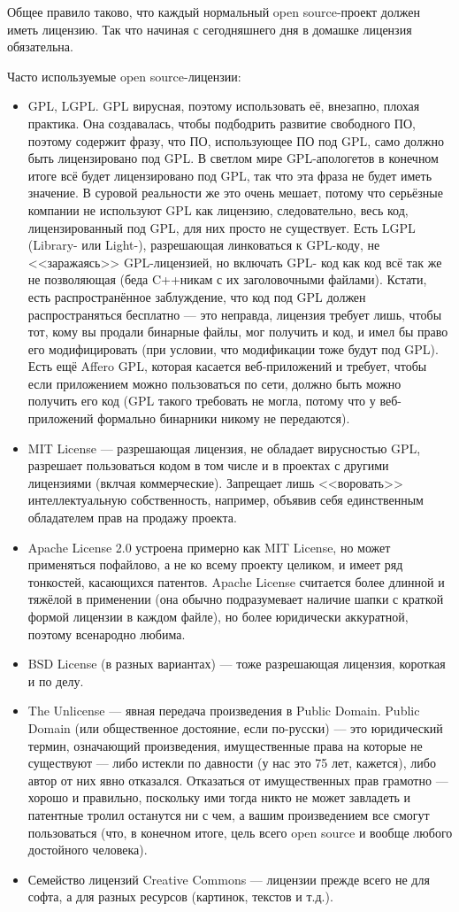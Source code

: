 \documentclass{../../text-style}
\begin{document}
Общее правило таково, что каждый нормальный open source-проект должен иметь лицензию. Так что начиная с сегодняшнего дня в домашке лицензия обязательна.

Часто используемые open source-лицензии:

\begin{itemize}
    \item GPL, LGPL. GPL вирусная, поэтому использовать её, внезапно, плохая практика. Она создавалась, чтобы подбодрить развитие свободного ПО, поэтому содержит фразу, что ПО, использующее ПО под GPL, само должно быть лицензировано под GPL. В светлом мире GPL-апологетов в конечном итоге всё будет лицензировано под GPL, так что эта фраза не будет иметь значение. В суровой реальности же это очень мешает, потому что серьёзные компании не используют GPL как лицензию, следовательно, весь код, лицензированный под GPL, для них просто не существует. Есть LGPL (Library- или Light-), разрешающая линковаться к GPL-коду, не <<заражаясь>> GPL-лицензией, но включать GPL- код как код всё так же не позволяющая (беда C++никам с их заголовочными файлами). Кстати, есть распространённое заблуждение, что код под GPL должен распространяться бесплатно --- это неправда, лицензия требует лишь, чтобы тот, кому вы продали бинарные файлы, мог получить и код, и имел бы право его модифицировать (при условии, что модификации тоже будут под GPL). Есть ещё Affero GPL, которая касается веб-приложений и требует, чтобы если приложением можно пользоваться по сети, должно быть можно получить его код (GPL такого требовать не могла, потому что у веб-приложений формально бинарники никому не передаются).
    \item MIT License --- разрешающая лицензия, не обладает вирусностью GPL, разрешает пользоваться кодом в том числе и в проектах с другими лицензиями (вклчая коммерческие). Запрещает лишь <<воровать>> интеллектуальную собственность, например, объявив себя единственным обладателем прав на продажу проекта.
    \item Apache License 2.0 устроена примерно как MIT License, но может применяться пофайлово, а не ко всему проекту целиком, и имеет ряд тонкостей, касающихся патентов. Apache License считается более длинной и тяжёлой в применении (она обычно подразумевает наличие шапки с краткой формой лицензии в каждом файле), но более юридически аккуратной, поэтому всенародно любима.
    \item BSD License (в разных вариантах) --- тоже разрешающая лицензия, короткая и по делу.
    \item The Unlicense --- явная передача произведения в Public Domain. Public Domain (или общественное достояние, если по-русски) --- это юридический термин, означающий произведения, имущественные права на которые не существуют --- либо истекли по давности (у нас это 75 лет, кажется), либо автор от них явно отказался. Отказаться от имущественных прав грамотно --- хорошо и правильно, поскольку ими тогда никто не может завладеть и патентные тролил останутся ни с чем, а вашим произведением все смогут пользоваться (что, в конечном итоге, цель всего open source и вообще любого достойного человека).
    \item Семейство лицензий Creative Commons --- лицензии прежде всего не для софта, а для разных ресурсов (картинок, текстов и т.д.).
\end{itemize}
\end{document}
